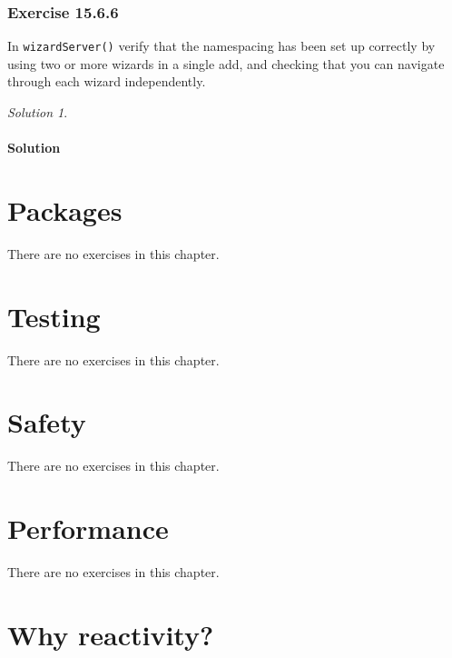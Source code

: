 \documentclass[
]{book}
\theoremstyle{definition}
\theoremstyle{definition}
\theoremstyle{definition}
\theoremstyle{definition}
\theoremstyle{remark}
\newtheorem*{solution}{Solution}
\begin{document}
\hypertarget{exercise-15.6.6}{%
\subsection*{Exercise 15.6.6}\label{exercise-15.6.6}}

In \texttt{wizardServer()} verify that the namespacing has been set up correctly by using two or more wizards in a single add, and checking that you can navigate through each wizard independently.

\begin{solution}
\leavevmode

\hypertarget{solution-51}{%
\subsubsection*{Solution}\label{solution-51}}

\end{solution}

\hypertarget{packages}{%
\chapter{Packages}\label{packages}}

There are no exercises in this chapter.

\hypertarget{testing}{%
\chapter{Testing}\label{testing}}

There are no exercises in this chapter.

\hypertarget{safety}{%
\chapter{Safety}\label{safety}}

There are no exercises in this chapter.

\hypertarget{performance}{%
\chapter{Performance}\label{performance}}

There are no exercises in this chapter.

\hypertarget{why-reactivity}{%
\chapter{Why reactivity?}\label{why-reactivity}}
\end{document}
